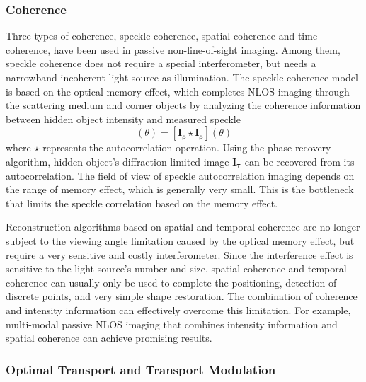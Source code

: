 \subsubsection{Coherence} \label{memoryEffect}
Three types of coherence, speckle coherence, spatial coherence and time coherence, have been used in passive non-line-of-sight imaging. Among them, speckle coherence does not require a special interferometer, but needs a narrowband incoherent light source as illumination. 
The speckle coherence model is based on the optical memory effect\cite{freundMemoryEffectsPropagation1988}, which completes NLOS imaging through the scattering medium and corner objects by analyzing the coherence information between hidden object intensity and measured speckle
\begin{equation}
   [\mathbf{I_{\tau}} \star \mathbf{I_{\tau}}](\theta)= [\mathbf{I_{\rho}} \star \mathbf{I_{\rho}}](\theta)
   \label{eq2_2}
\end{equation}
where $\star$ represents the autocorrelation operation. Using the phase recovery algorithm\cite{fienupPhaseRetrievalAlgorithms1982,bertolottiNoninvasiveImagingOpaque2012a}, hidden object's diffraction-limited image $\mathbf{I_{\tau}}$ can be recovered from its autocorrelation\cite{katz2014non}. The field of view of speckle autocorrelation imaging depends on the range of memory effect, which is generally very small. This is the bottleneck that limits the speckle correlation based on the memory effect.


Reconstruction algorithms based on spatial and temporal coherence are no longer subject to the viewing angle limitation caused by the optical memory effect\cite{freundMemoryEffectsPropagation1988}, but require a very sensitive and costly interferometer. Since the interference effect is sensitive to the light source's number and size, spatial coherence and temporal coherence can usually only be used to complete the positioning, detection of discrete points, and very simple shape restoration. The combination of coherence and intensity information can effectively overcome this limitation. For example, multi-modal passive NLOS imaging that combines intensity information and spatial coherence can achieve promising results\cite{beckusMultiModalNonLineofSightPassive2019}.

\subsubsection{Optimal Transport and Transport Modulation}

